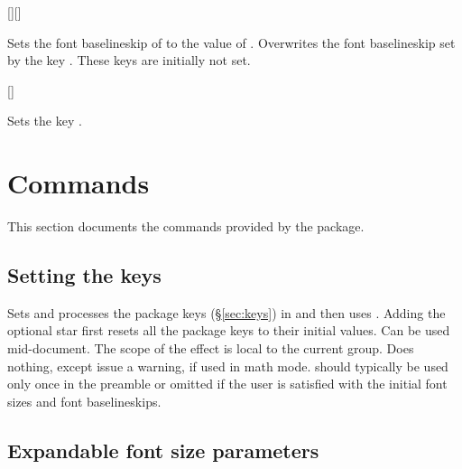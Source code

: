 \documentclass{beery}
\begin{document}
\begin{displaycode}
  [][]
\end{displaycode}

Sets the font baselineskip of  to the value of .
Overwrites the font baselineskip set by the key .
These keys are initially not set.

\begin{displaycode}
  []
\end{displaycode}

Sets the key .


\section{Commands}
\label{sec:commands}

This section documents the commands provided by the  package.

\subsection{Setting the keys}
\label{subsec:fontscalesetup}

\begin{displaycode}
   \sarg{} 
\end{displaycode}

Sets and processes the  package keys (\S\ref{sec:keys}) in  and then uses .
Adding the optional star \sarg{} first resets all the  package keys to their initial values.
Can be used mid-document.
The scope of the effect is local to the current group.
Does nothing, except issue a warning, if used in math mode.
 should typically be used only once in the preamble or omitted if the user is satisfied with the initial font sizes and font baselineskips.

\subsection{Expandable font size parameters}
\label{subsec:expandable}

\begin{displaycode}
  \nopagebreak\newline
  \newline
  \nopagebreak\newline
\end{displaycode}
\end{document}

